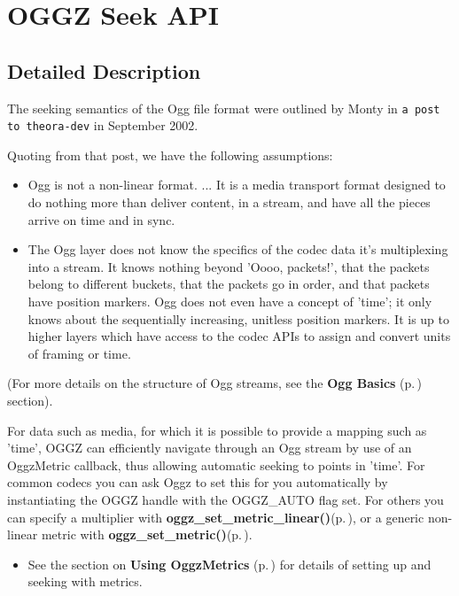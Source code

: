 \section{OGGZ Seek API}
\label{group__seek__api}


\subsection{Detailed Description}
The seeking semantics of the Ogg file format were outlined by Monty in {\tt a post to theora-dev} in September 2002. 

Quoting from that post, we have the following assumptions:

\begin{itemize}
\item Ogg is not a non-linear format. ... It is a media transport format designed to do nothing more than deliver content, in a stream, and have all the pieces arrive on time and in sync.\item The Ogg layer does not know the specifics of the codec data it's multiplexing into a stream. It knows nothing beyond 'Oooo, packets!', that the packets belong to different buckets, that the packets go in order, and that packets have position markers. Ogg does not even have a concept of 'time'; it only knows about the sequentially increasing, unitless position markers. It is up to higher layers which have access to the codec APIs to assign and convert units of framing or time.\end{itemize}


(For more details on the structure of Ogg streams, see the {\bf Ogg Basics }{\rm (p.\,\pageref{group__basics})} section).

For data such as media, for which it is possible to provide a mapping such as 'time', OGGZ can efficiently navigate through an Ogg stream by use of an Oggz\-Metric callback, thus allowing automatic seeking to points in 'time'. For common codecs you can ask Oggz to set this for you automatically by instantiating the OGGZ handle with the OGGZ\_\-AUTO flag set. For others you can specify a multiplier with {\bf oggz\_\-set\_\-metric\_\-linear()}{\rm (p.\,\pageref{group__seek__api_a1})}, or a generic non-linear metric with {\bf oggz\_\-set\_\-metric()}{\rm (p.\,\pageref{group__seek__api_a2})}.

\begin{itemize}
\item See the section on {\bf Using Oggz\-Metrics }{\rm (p.\,\pageref{group__metric})} for details of setting up and seeking with metrics.\end{itemize}


